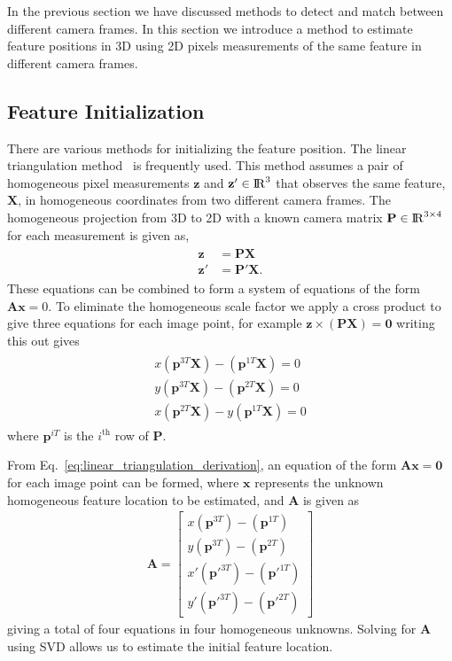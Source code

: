 \documentclass{report}
\renewcommand{\Vec}[1]{{\mathbf{#1}}}
\newcommand{\Mat}[1]{{\mathbf{#1}}}
\newcommand{\real}{{\rm I\!R}}
\newcommand{\measurement}{{\Vec{z}}}
\begin{document}
In the previous section we have discussed methods to detect and match between
different camera frames. In this section we introduce a method to estimate
feature positions in 3D using 2D pixels measurements of the same feature in
different camera frames.

\subsection{Feature Initialization}
\label{subsec:linear_triangulation}

There are various methods for initializing the feature position. The linear
triangulation method~\cite{Hartley2003} is frequently used. This method assumes
a pair of homogeneous pixel measurements $\measurement$ and $\measurement' \in
\real^{3}$ that observes the same feature, $\mathbf{X}$, in homogeneous
coordinates from two different camera frames. The homogeneous projection from
3D to 2D with a known camera matrix $\Mat{P} \in \real^{3 \times 4}$
for each measurement is given as,
%
\begin{align}
\begin{split}
	\measurement &= \mathbf{P} \mathbf{X} \\
	\measurement' &= \mathbf{P}' \mathbf{X}.
\end{split}
\end{align}
%
These equations can be combined to form a system of equations of the form
$\Mat{A} \Vec{x} = 0$. To eliminate the homogeneous scale factor we apply a
cross product to give three equations for each image point, for example
$\measurement \times (\Mat{P} \Mat{X}) = \Vec{0}$ writing this out gives
%
\begin{align}
\label{eq:linear_triangulation_derivation}
\begin{split}
  x (\Vec{p}^{3T} \Vec{X}) - (\Vec{p}^{1T} \Vec{X}) = 0 \\
  y (\Vec{p}^{3T} \Vec{X}) - (\Vec{p}^{2T} \Vec{X}) = 0 \\
  x (\Vec{p}^{2T} \Vec{X}) - y (\Vec{p}^{1T} \Vec{X}) = 0
\end{split}
\end{align}
%
where $\Vec{p}^{iT}$ is the $i^{\mbox{th}}$ row of $\Vec{P}$.

From Eq.~\eqref{eq:linear_triangulation_derivation}, an equation of the form
$\Mat{A} \Vec{x} = \Vec{0}$ for each image point can be formed, where
$\Vec{x}$ represents the unknown homogeneous feature location to be
estimated, and $\Mat{A}$ is given as
%
\begin{align}
  \mathbf{A} =
  \begin{bmatrix}
    x (\Vec{p}^{3T}) - (\Vec{p}^{1T}) \\
    y (\Vec{p}^{3T}) - (\Vec{p}^{2T}) \\
    x' (\Vec{p'}^{3T}) - (\Vec{p'}^{1T}) \\
    y' (\Vec{p'}^{3T}) - (\Vec{p'}^{2T})
  \end{bmatrix}
  \label{eq:linear_triangulation_ derivation}
\end{align}
%
giving a total of four equations in four homogeneous unknowns. Solving for
$\Vec{A}$ using SVD allows us to estimate the initial feature location.
\end{document}
